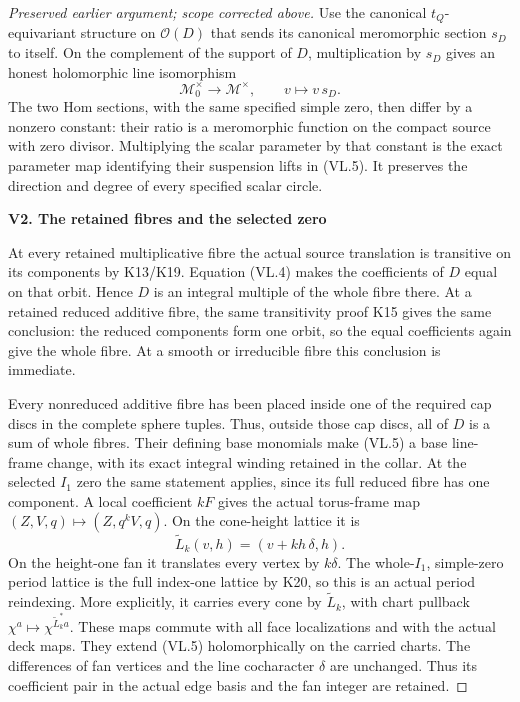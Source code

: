 \begin{proof}[Preserved earlier argument; scope corrected above]
Use the canonical \(t_Q\)-equivariant structure on
\(\mathcal O(D)\) that sends its canonical meromorphic
section \(s_D\) to itself. On the complement of the support
of \(D\), multiplication by \(s_D\) gives an honest
holomorphic line isomorphism
\[
 \mathcal M_0^\times\longrightarrow\mathcal M^\times,
                       \qquad v\longmapsto v\,s_D .
 \tag{VL.5}
\]
The two Hom sections, with the same specified simple zero,
then differ by a nonzero constant: their ratio is a
meromorphic function on the compact source with zero
divisor. Multiplying the scalar parameter by that constant
is the exact parameter map identifying their suspension
lifts in (VL.5). It preserves the direction and degree
of every specified scalar circle.

\par

\medskip\noindent\textbf{V2. The retained fibres and the selected zero}

\par\nobreak

At every retained multiplicative fibre the actual source
translation is transitive on its components by K13/K19.
Equation (VL.4) makes the coefficients of \(D\) equal on
that orbit. Hence \(D\) is an integral multiple of the
whole fibre there. At a retained reduced additive fibre,
the same transitivity proof K15 gives the same conclusion:
the reduced components form one orbit, so the equal
coefficients again give the whole fibre. At a smooth or
irreducible fibre this conclusion is immediate.

Every nonreduced additive fibre has been placed inside
one of the required cap discs in the complete sphere
tuples. Thus, outside those cap discs, all of \(D\) is a
sum of whole fibres. Their defining base monomials make
(VL.5) a base line-frame change, with its exact integral
winding retained in the collar. At the selected \(I_1\)
zero the same statement applies, since its full reduced
fibre has one component. A local coefficient \(kF\)
gives the actual torus-frame map
\((Z,V,q)\mapsto(Z,q^kV,q)\). On the cone-height lattice
it is
\[
 \widetilde L_k(v,h)=(v+k h\,\delta,h).
 \tag{VL.6}
\]
On the height-one fan it translates every vertex by
\(k\delta\). The whole-\(I_1\), simple-zero period lattice
is the full index-one lattice by K20, so this is an
actual period reindexing. More explicitly, it carries
every cone by \(\widetilde L_k\), with chart pullback
\(\chi^a\mapsto\chi^{\widetilde L_k^*a}\). These maps
commute with all face localizations and with the
actual deck maps. They extend (VL.5) holomorphically
on the carried charts. The differences of fan vertices
and the line cocharacter \(\delta\) are unchanged.
Thus its coefficient pair in the actual edge basis
and the fan integer are retained.


\end{proof}
